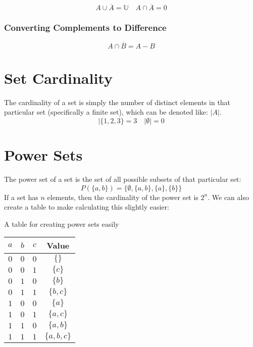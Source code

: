 \[
    A \cup \overline{A} = \mathbb{U} \quad A \cap \overline{A} = 0
\]

\subsubsection{Converting Complements to Difference}\label{ssub:converting_complements_to_difference}

\[
    A \cap \overline{B} = A - B
\]

\section{Set Cardinality}\label{sec:set_cardinality}

The cardinality of a set is simply the number of distinct elements in that particular set (specifically a finite set), which can be denoted like: \(|A|\).
\[
    |\{1, 2, 3\} = 3 \quad |\emptyset| = 0
\]

\section{Power Sets}\label{sec:power_sets}

The power set of a set is the set of all possible subsets of that particular set:
\[
    P(\{a, b\}) = \{\emptyset, \{a, b\}, \{a\}, \{b\}\}
\]
If a set has \(n\) elements, then the cardinality of the power set is \(2^{n}\).
We can also create a table to make calculating this slightly easier:

\begin{highlight}{A table for creating power sets easily}
    \begin{tabular}{ccc|c}
        \toprule
        \(a\) & \(b\) & \(c\) & Value           \\
        \midrule
        \(0\) & \(0\) & \(0\) & \(\{\}\)        \\
        \(0\) & \(0\) & \(1\) & \(\{c\}\)       \\
        \(0\) & \(1\) & \(0\) & \(\{b\}\)       \\
        \(0\) & \(1\) & \(1\) & \(\{b, c\}\)    \\
        \(1\) & \(0\) & \(0\) & \(\{a\}\)       \\
        \(1\) & \(0\) & \(1\) & \(\{a, c\}\)    \\
        \(1\) & \(1\) & \(0\) & \(\{a, b\}\)    \\
        \(1\) & \(1\) & \(1\) & \(\{a, b, c\}\) \\
        \bottomrule
    \end{tabular}
\end{highlight}

